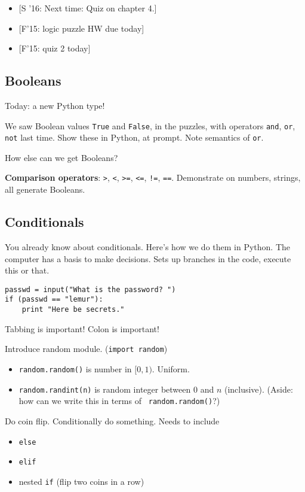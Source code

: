 \documentclass{article}
\begin{document}
\begin{itemize}
\item{} [S '16: Next time: Quiz on chapter 4.]
\item{} [F'15: logic puzzle HW due today]
\item{} [F'15: quiz 2 today]
\end{itemize}

\subsection*{Booleans}

Today: a new Python type!

We saw Boolean values {\tt True} and {\tt False}, in the puzzles, with
operators {\tt and}, {\tt or}, {\tt not} last time.  Show these in
Python, at prompt.  Note semantics of {\tt or}.

How else can we get Booleans?

\textbf{Comparison operators}: \verb|>|, \verb|<|, \verb|>=|,
\verb|<=|, \verb|!=|, \verb|==|.  Demonstrate on numbers, strings, all
generate Booleans.

\subsection*{Conditionals}

You already know about conditionals.  Here's how we do them in Python.
The computer has a basis to make decisions.  Sets up branches in the
code, execute this or that.

\begin{verbatim}
passwd = input("What is the password? ")
if (passwd == "lemur"):
    print "Here be secrets."
\end{verbatim}

Tabbing is important!  Colon is important!

Introduce random module. ({\tt import random})
\begin{itemize}
\item {\tt random.random()} is number in $[0,1)$. Uniform.
\item {\tt random.randint(n)} is random integer between $0$ and $n$
  (inclusive).  (Aside: how can we write this in terms of {\tt
    random.random()}?)
\end{itemize}
Do coin flip.  Conditionally do something.  Needs to include
\begin{itemize}
\item {\tt else}
\item {\tt elif}
\item nested {\tt if}  (flip two coins in a row)
\end{itemize}
\end{document}

